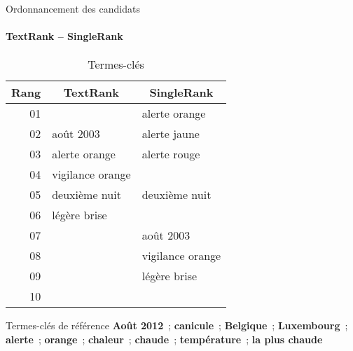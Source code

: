   \begin{frame}{Ordonnancement des candidats}\framesubtitle{TextRank -- SingleRank}
    \begin{table}
      \centering
      \begin{tabular}{r|l|l}
        \toprule
        \textbf{Rang} & \multicolumn{1}{c|}{\textbf{TextRank}} & \multicolumn{1}{c}{\textbf{SingleRank}} \\
        \hline
        01 & \cellcolor{termithgreen!30}{août 2012} & alerte orange \\
        02 & août 2003 & alerte jaune \\
        03 & alerte orange & alerte rouge \\
        04 & vigilance orange & \cellcolor{termithgreen!30}{alerte} \\
        05 & deuxième nuit & deuxième nuit \\
        06 & légère brise & \cellcolor{termithgreen!30}{août 2012} \\
        07 & & août 2003 \\
        08 & & vigilance orange \\
        09 & & légère brise \\
        10 & & \cellcolor{termithgreen!30}{Luxembourg} \\
        \bottomrule
      \end{tabular}

      \caption{Termes-clés}
    \end{table}

    \begin{exampleblock}{\small Termes-clés de référence}\justifying\small
      \textbf{Août 2012}~; \textbf{canicule}~;
      \textbf{Belgique}~; \textbf{Luxembourg}~; \textbf{alerte}~;
      \textbf{orange}~; \textbf{chaleur}~; \textbf{chaude}~;
      \textbf{température}~; \textbf{la plus chaude}
    \end{exampleblock}
  \end{frame}

